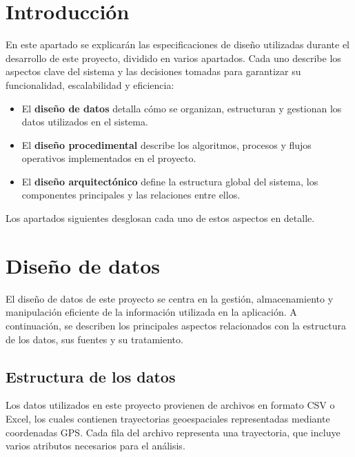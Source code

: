 
\section{Introducción}

En este apartado se explicarán las especificaciones de diseño utilizadas durante el desarrollo de este proyecto, dividido en varios apartados. Cada uno describe los aspectos clave del sistema y las decisiones tomadas para garantizar su funcionalidad, escalabilidad y eficiencia:

\begin{itemize}
    \item El \textbf{diseño de datos} detalla cómo se organizan, estructuran y gestionan los datos utilizados en el sistema.
    \item El \textbf{diseño procedimental} describe los algoritmos, procesos y flujos operativos implementados en el proyecto.
    \item El \textbf{diseño arquitectónico} define la estructura global del sistema, los componentes principales y las relaciones entre ellos.
\end{itemize}

Los apartados siguientes desglosan cada uno de estos aspectos en detalle.

\section{Diseño de datos}

El diseño de datos de este proyecto se centra en la gestión, almacenamiento y manipulación eficiente de la información utilizada en la aplicación. A continuación, se describen los principales aspectos relacionados con la estructura de los datos, sus fuentes y su tratamiento.

\subsection{Estructura de los datos}

Los datos utilizados en este proyecto provienen de archivos en formato CSV o Excel, los cuales contienen trayectorias geoespaciales representadas mediante coordenadas GPS. Cada fila del archivo representa una trayectoria, que incluye varios atributos necesarios para el análisis.

